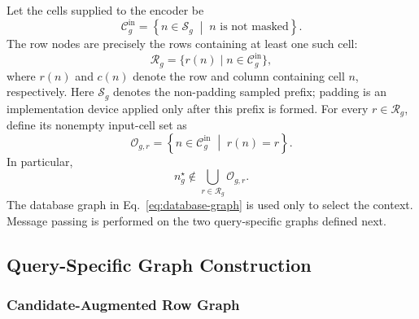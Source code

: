 \documentclass[11pt]{article}
\begin{document}
Let the cells supplied to the encoder be
\begin{equation}
    \mathcal C_g^{\mathrm{in}}
    =
    \left\{
        n\in\mathcal S_g
        \;\middle|\;
        n\text{ is not masked}
    \right\}.
    \label{eq:input-cell-set}
\end{equation}
The row nodes are precisely the rows containing at least one such cell:
\begin{equation}
    \mathcal R_g
    =
    \bigl\{
        r(n)\;\big|\;n\in\mathcal C_g^{\mathrm{in}}
    \bigr\},
    \label{eq:sampled-row-set}
\end{equation}
where \(r(n)\) and \(c(n)\) denote the row and column containing cell \(n\),
respectively.  Here
\(\mathcal S_g\) denotes the non-padding sampled prefix; padding is an
implementation device applied only after this prefix is formed.  For every
\(r\in\mathcal R_g\), define its nonempty input-cell set as
\begin{equation}
    \mathcal O_{g,r}
    =
    \left\{
        n\in\mathcal C_g^{\mathrm{in}}
        \;\middle|\;
        r(n)=r
    \right\}.
    \label{eq:row-input-cells}
\end{equation}
In particular,
\begin{equation}
    n_g^\star
    \notin
    \bigcup_{r\in\mathcal R_g}\mathcal O_{g,r}.
    \label{eq:target-exclusion}
\end{equation}
The database graph in Eq.~\eqref{eq:database-graph} is used only to select
the context.  Message passing is performed on the two query-specific graphs
defined next.


\subsection{Query-Specific Graph Construction}
\label{sec:graph-construction}

\subsubsection{Candidate-Augmented Row Graph}
\label{sec:main-graph}
\end{document}
